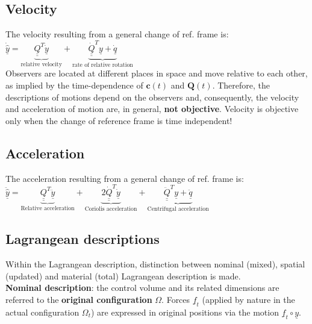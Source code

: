 \subsection*{Velocity}
\smallskip

The velocity resulting from a general change of ref. frame is: \\

$ \dot{\hat{\underline{y}}} = \underbrace{\underline{\underline{Q}}^T \dot{\underline{y}}}_{\text{relative velocity}} + \underbrace{\underline{\underline{\dot{Q}}}^T \underline{y} + \dot{\underline{q}}}_{\text{rate of relative rotation}} $ \\
Observers are located at different places in space and move relative to each other, as implied by the time-dependence of $\mathbf{c}(t)$ and $\mathbf{Q}(t)$. Therefore, the descriptions of motions depend on the observers and, consequently, the velocity and acceleration of motion are, in general, \textbf{not objective}.
Velocity is objective only when the change of reference frame is time independent! \\

\subsection*{Acceleration}
\smallskip

The acceleration resulting from a general change of ref. frame is: \\

$ \ddot{\hat{\underline{y}}} = \underbrace{\underline{\underline{Q}}^T \ddot{\underline{y}}}_{\text{Relative acceleration}} + \underbrace{2\underline{\underline{\dot{Q}}}^T \underline{\dot{y}}}_{\text{Coriolis acceleration}} + \underbrace{\underline{\underline{\ddot{Q}}}^T \underline{y} + {\underline{\ddot{q}}}}_{\text{Centrifugal acceleration}} $ \\


\subsection*{Lagrangean descriptions}
\smallskip
Within the Lagrangean description, distinction between nominal (mixed), spatial (updated) and material (total) Lagrangean description is made. \\

\textbf{Nominal description}: the control volume and its related dimensions are referred to the \textbf{original configuration} $\Omega$. Forces $\underline{f}_t$ (applied by nature in the actual configuration
$\Omega_t$) are expressed in original positions via the motion $ \underline{f}_t \circ \underline{y}$. \\


